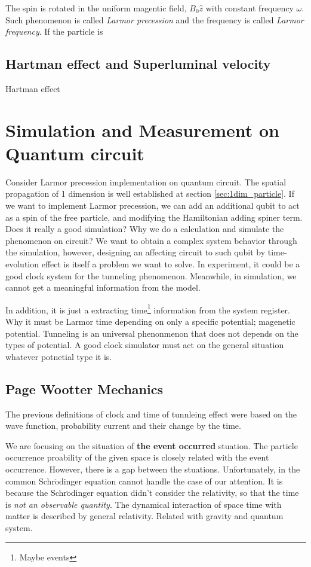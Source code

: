 The spin is rotated in the uniform magentic field, $B_0 \hat{z}$ with constant frequency $\omega$. 
Such phenomenon is called \textit{Larmor precession} and the frequency is called \textit{Larmor frequency}.
If the particle is 

\subsection{Hartman effect and Superluminal velocity}

Hartman effect


\section{Simulation and Measurement on Quantum circuit}

Consider Larmor precession implementation on quantum circuit. 
The spatial propagation of 1 dimension is well established at section \ref{sec:1dim_particle}.
If we want to implement Larmor precession, 
we can add an additional qubit to act as a spin of the free particle,
and modifying the Hamiltonian adding spiner term. 
Does it really a good simulation? Why we do a calculation and simulate the phenomenon on circuit?
We want to obtain a complex system behavior through the simulation, 
however, designing an affecting circuit to such qubit by time-evolution effect 
is itself a problem we want to solve. 
In experiment, it could be a good clock system for the tunneling phenomenon.
Meanwhile, in simulation, we cannot get a meaningful information from the model.

In addition, it is just a extracting time\footnote[4]{Maybe events} information from the system register.
Why it must be Larmor time depending on only a specific potential; magenetic potential.
Tunneling is an universal phenonmenon that does not depends on the types of potential.
A good clock simulator must act on the general situation whatever potnetial type it is.

\subsection{Page Wootter Mechanics}

The previous definitions of clock and time of tunnleing effect were based on the wave function, 
probability current and their change by the time.

We are focusing on the situation of \textbf{the event occurred} stuation.
The particle occurrence proability of the given space is closely related with the event occurrence.
However, there is a gap between the stuations. 
Unfortunately, in the common Schr$\ddot{\mbox{o}}$dinger  equation cannot handle the case of our attention.
It is because the Schr$\ddot{\mbox{o}}$dinger  equation didn't consider the relativity, so that the time is \textit{not an observable quantity}.
The dynamical interaction of space time with matter is described by general relativity.
Related with gravity and quantum system. 

